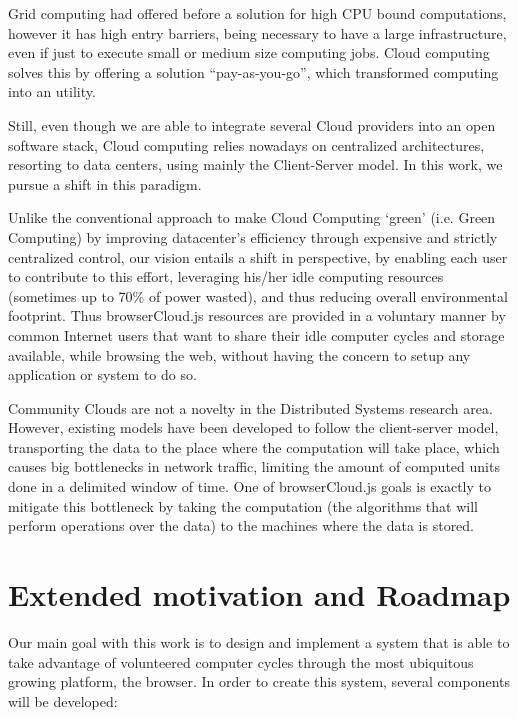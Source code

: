 Grid computing had offered before a solution for high CPU bound computations, however it has high entry barriers, being necessary to have a large infrastructure, even if just to execute small or medium size computing jobs. Cloud computing solves this by offering a solution ``pay-as-you-go'', which transformed computing into an utility.

Still, even though we are able to integrate several Cloud providers into an open software stack, Cloud computing relies nowadays on centralized architectures, resorting to data centers, using mainly the Client-Server model. In this work, we pursue a shift in this paradigm.

Unlike the conventional approach to make Cloud Computing `green' (i.e. Green Computing) by improving datacenter's efficiency through expensive and strictly centralized control, our vision entails a shift in perspective, by enabling each user to contribute to this effort, leveraging his/her idle computing resources (sometimes up to 70\% of power wasted), and thus reducing overall environmental footprint. Thus browserCloud.js resources are provided in a voluntary manner by common Internet users that want to share their idle computer cycles and storage available, while browsing the web, without having the concern to setup any application or system to do so.

Community Clouds are not a novelty in the Distributed Systems research area. However, existing models have been developed to follow the client-server model, transporting the data to the place where the computation will take place, which causes big bottlenecks in network traffic, limiting the amount of computed units done in a delimited window of time. One of browserCloud.js goals is exactly to mitigate this bottleneck by taking the computation (the algorithms that will perform operations over the data) to the machines where the data is stored.

\section{Extended motivation and Roadmap}

Our main goal with this work is to design and implement a system that is able to take advantage of volunteered computer cycles through the most ubiquitous growing platform, the browser. In order to create this system, several components will be developed:

